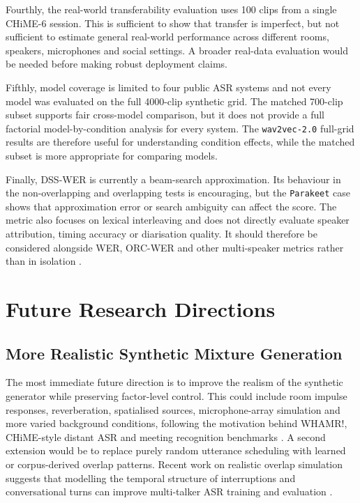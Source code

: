 Fourthly, the real-world transferability evaluation uses 100 clips from a single CHiME-6 session. This is sufficient to show that transfer is imperfect, but not sufficient to estimate general real-world performance across different rooms, speakers, microphones and social settings. A broader real-data evaluation would be needed before making robust deployment claims.

Fifthly, model coverage is limited to four public ASR systems and not every model was evaluated on the full 4000-clip synthetic grid. The matched 700-clip subset supports fair cross-model comparison, but it does not provide a full factorial model-by-condition analysis for every system. The \texttt{wav2vec-2.0} full-grid results are therefore useful for understanding condition effects, while the matched subset is more appropriate for comparing models.

Finally, DSS-WER is currently a beam-search approximation. Its behaviour in the non-overlapping and overlapping tests is encouraging, but the \texttt{Parakeet} case shows that approximation error or search ambiguity can affect the score. The metric also focuses on lexical interleaving and does not directly evaluate speaker attribution, timing accuracy or diarisation quality. It should therefore be considered alongside WER, ORC-WER and other multi-speaker metrics rather than in isolation \citep{von_Neumann_2023, vonneumann2024meetevaltoolkitcomputationword, von_Neumann_2025}.

\section{Future Research Directions}
\subsection{More Realistic Synthetic Mixture Generation}
The most immediate future direction is to improve the realism of the synthetic generator while preserving factor-level control. This could include room impulse responses, reverberation, spatialised sources, microphone-array simulation and more varied background conditions, following the motivation behind WHAMR!, CHiME-style distant ASR and meeting recognition benchmarks \citep{maciejewski2020whamrnoisyreverberantsinglechannel, BARKER2017605, watanabe2020chime6challengetacklingmultispeakerspeech}. A second extension would be to replace purely random utterance scheduling with learned or corpus-derived overlap patterns. Recent work on realistic overlap simulation suggests that modelling the temporal structure of interruptions and conversational turns can improve multi-talker ASR training and evaluation \citep{yang2022simulatingrealisticspeechoverlaps}.

